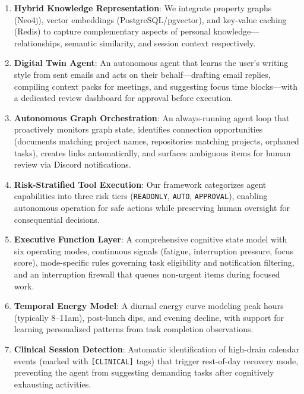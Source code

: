 \documentclass[11pt,a4paper]{article}
\begin{document}
\begin{enumerate}
    \item \textbf{Hybrid Knowledge Representation}: We integrate property graphs (Neo4j), vector embeddings (PostgreSQL/pgvector), and key-value caching (Redis) to capture complementary aspects of personal knowledge---relationships, semantic similarity, and session context respectively.

    \item \textbf{Digital Twin Agent}: An autonomous agent that learns the user's writing style from sent emails and acts on their behalf---drafting email replies, compiling context packs for meetings, and suggesting focus time blocks---with a dedicated review dashboard for approval before execution.

    \item \textbf{Autonomous Graph Orchestration}: An always-running agent loop that proactively monitors graph state, identifies connection opportunities (documents matching project names, repositories matching projects, orphaned tasks), creates links automatically, and surfaces ambiguous items for human review via Discord notifications.

    \item \textbf{Risk-Stratified Tool Execution}: Our framework categorizes agent capabilities into three risk tiers (\texttt{READONLY}, \texttt{AUTO}, \texttt{APPROVAL}), enabling autonomous operation for safe actions while preserving human oversight for consequential decisions.

    \item \textbf{Executive Function Layer}: A comprehensive cognitive state model with six operating modes, continuous signals (fatigue, interruption pressure, focus score), mode-specific rules governing task eligibility and notification filtering, and an interruption firewall that queues non-urgent items during focused work.

    \item \textbf{Temporal Energy Model}: A diurnal energy curve modeling peak hours (typically 8--11am), post-lunch dips, and evening decline, with support for learning personalized patterns from task completion observations.

    \item \textbf{Clinical Session Detection}: Automatic identification of high-drain calendar events (marked with \texttt{[CLINICAL]} tags) that trigger rest-of-day recovery mode, preventing the agent from suggesting demanding tasks after cognitively exhausting activities.


\end{enumerate}
\end{document}
